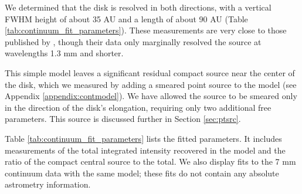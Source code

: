 \documentclass[twocolumn]{aastex61}
\begin{document}
We determined that the disk is resolved in both
directions, with a vertical FWHM height of about 35 AU and a length of about
90 AU (Table \ref{tab:continuum_fit_parameters}).  These measurements
are very close to those published by \citet{Plambeck2016a}, though their data
only marginally resolved the source at wavelengths 1.3 mm and shorter.

This simple model leaves a significant residual compact source near the center
of the disk, which we measured by adding a smeared point source to the model
(see Appendix \ref{appendix:contmodel}).  We have allowed the source to be
smeared only in the direction of the disk's elongation, requiring only two
additional free parameters.  This source is discussed further in Section
\ref{sec:ptsrc}.

Table \ref{tab:continuum_fit_parameters} lists the fitted parameters.  It 
includes measurements of the total integrated intensity recovered in the model
and the ratio of the compact central source to the total.  We also display
fits to the \citet{Reid2007a} 7 mm continuum data with the same model;
these fits do not contain any absolute astrometry information.

\end{document}
